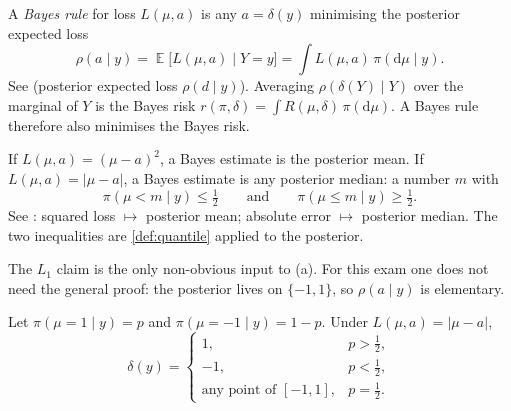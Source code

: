 \documentclass[11pt,a4paper]{article}
\DeclareMathOperator{\E}{\mathbb{E}}
\begin{document}
\begin{definition}
\label{def:bayes-rule}
A \emph{Bayes rule} for loss \(L(\mu,a)\) is any \(a=\delta(y)\) minimising the posterior expected loss
\[
\rho(a\mid y)
=
\E\bigl[L(\mu,a)\mid Y=y\bigr]
=
\int L(\mu,a)\,\pi(\mathrm{d}\mu\mid y).
\]
See \citep[Chapter~9]{gelman2013} (posterior expected loss \(\rho(d\mid y)\)). Averaging \(\rho(\delta(Y)\mid Y)\) over the marginal of \(Y\) is the Bayes risk \(r(\pi,\delta)=\int R(\mu,\delta)\,\pi(\mathrm{d}\mu)\). A Bayes rule therefore also minimises the Bayes risk.
\end{definition}

\begin{proposition}
\label{prop:l1-median}
If \(L(\mu,a)=(\mu-a)^2\), a Bayes estimate is the posterior mean. If \(L(\mu,a)=|\mu-a|\), a Bayes estimate is any posterior median: a number \(m\) with
\[
\pi(\mu<m\mid y)\le\tfrac12
\qquad\text{and}\qquad
\pi(\mu\le m\mid y)\ge\tfrac12.
\]
See \citep{gelmannotes}: squared loss \(\mapsto\) posterior mean; absolute error \(\mapsto\) posterior median. The two inequalities are \cref{def:quantile} applied to the posterior.
\end{proposition}

The \(L_1\) claim is the only non-obvious input to (a). For this exam one does not need the general proof: the posterior lives on \(\{-1,1\}\), so \(\rho(a\mid y)\) is elementary.

\begin{lemma}
\label{lem:twopoint-l1}
Let \(\pi(\mu=1\mid y)=p\) and \(\pi(\mu=-1\mid y)=1-p\). Under \(L(\mu,a)=|\mu-a|\),
\[
\delta(y)
=
\begin{cases}
1, & p>\tfrac12,\\
-1, & p<\tfrac12,\\
\text{any point of }[-1,1], & p=\tfrac12.
\end{cases}
\]
\end{lemma}
\end{document}
